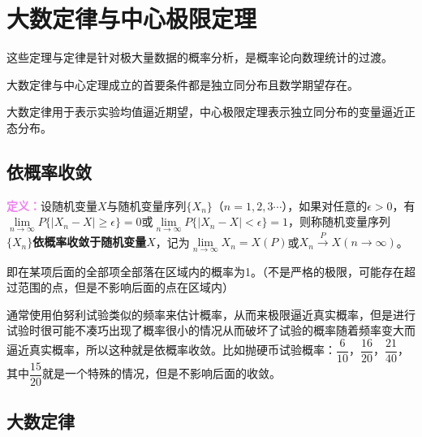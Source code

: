 \setcounter{tocdepth}{4}
\setcounter{secnumdepth}{4}
\renewcommand{\baselinestretch}{1.5}
\chapter{大数定律与中心极限定理}

这些定理与定律是针对极大量数据的概率分析，是概率论向数理统计的过渡。

大数定律与中心定理成立的首要条件都是独立同分布且数学期望存在。

大数定律用于表示实验均值逼近期望，中心极限定理表示独立同分布的变量逼近正态分布。

\section{依概率收敛}

\textcolor{violet}{\textbf{定义：}}设随机变量$X$与随机变量序列$\{X_n\}$（$n=1,2,3\cdots$），如果对任意的$\epsilon>0$，有$\lim\limits_{n\to\infty}P\{\vert X_n-X\vert\geqslant\epsilon\}=0$或$\lim\limits_{n\to\infty}P\{\vert X_n-X\vert<\epsilon\}=1$，则称随机变量序列$\{X_n\}$\textbf{依概率收敛于随机变量$X$}，记为$\lim\limits_{n\to\infty}X_n=X(P)$或$X_n\overset{P}{\rightarrow}X(n\to\infty)$。

即在某项后面的全部项全部落在区域内的概率为1。（不是严格的极限，可能存在超过范围的点，但是不影响后面的点在区域内）

通常使用伯努利试验类似的频率来估计概率，从而来极限逼近真实概率，但是进行试验时很可能不凑巧出现了概率很小的情况从而破坏了试验的概率随着频率变大而逼近真实概率，所以这种就是依概率收敛。比如抛硬币试验概率：$\dfrac{6}{10}$，$\dfrac{16}{20}$，$\dfrac{21}{40}$，其中$\dfrac{15}{20}$就是一个特殊的情况，但是不影响后面的收敛。

\section{大数定律}

